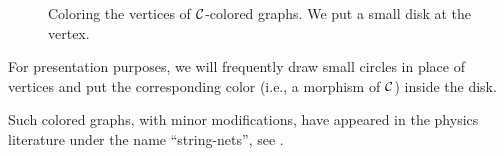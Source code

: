 \begin{figure} [ht]
\centering
  \caption{Coloring the vertices of $\mathcal{C}$-colored graphs.
  We put a small disk at the vertex.}
  \label{f:graphical-morphism3}
\end{figure}

For presentation purposes, we will frequently draw small circles in place of
vertices and put the corresponding color (i.e., a morphism of $\mathcal{C}$) inside
the disk.

Such colored graphs, with minor modifications, have appeared in the physics
literature under the name ``string-nets'', see .


